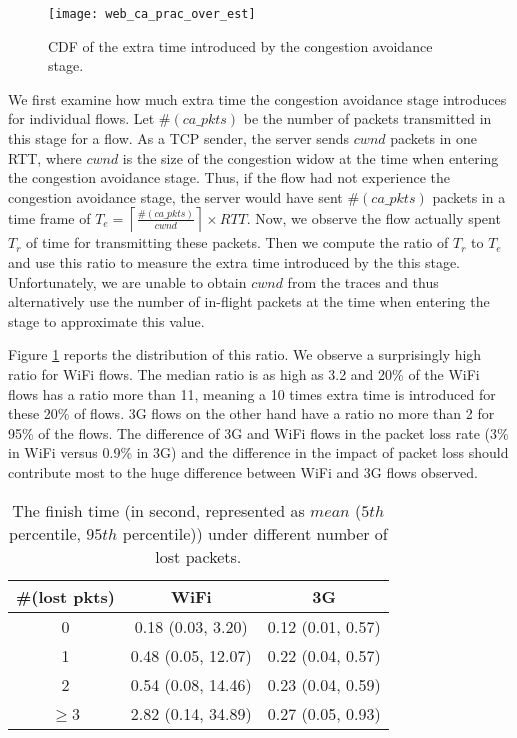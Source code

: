 \begin{figure}[th]
\centering
\texttt{[image: web\_ca\_prac\_over\_est]}
\caption{CDF of the extra time introduced by the congestion avoidance stage.}
\label{fig:web_ca_round}
\end{figure}

We first examine how much extra time the congestion avoidance stage introduces for individual flows. Let $\#(ca\_pkts)$ be the number of packets transmitted in this stage for a flow. As a TCP sender, the server sends $cwnd$ packets in one RTT, where $cwnd$ is the size of the congestion widow at the time when entering the congestion avoidance stage. Thus, if the flow had not experience the congestion avoidance stage, the server would have sent $\#(ca\_pkts)$ packets in a time frame of $T_e =  \left \lceil{\frac{\#(ca\_pkts)}{cwnd}} \right \rceil  \times RTT$. Now, we observe the flow actually spent $T_r$ of time for transmitting these packets. Then we compute the ratio of  $T_r$ to $T_e$ and use this ratio to measure the extra time introduced by the this stage. Unfortunately, we are unable to obtain $cwnd$ from the traces and thus alternatively use the number of in-flight packets at the time when entering the stage to approximate this value\cite{rfc56812009tcp}. 


 
Figure \ref{fig:web_ca_round} reports the distribution of this ratio. We observe a surprisingly high ratio for WiFi flows. The median ratio is as high as 3.2 and 20\% of the WiFi flows has a ratio more than 11, meaning a 10 times extra time is introduced for these 20\% of flows. 3G flows on the other hand have a ratio no more than 2 for 95\% of the flows. The difference of 3G and WiFi flows in the packet loss rate (3\% in WiFi versus 0.9\% in 3G) and the difference in the impact of packet loss should contribute most to the huge difference between WiFi and 3G flows observed. 



\begin{table}[th]
\caption{The finish time (in second, represented as $mean$ ($5th$ percentile, $95th$ percentile)) under different number of lost packets.}
\label{tab:web_loss_finish_time}
\centering
\renewcommand{\arraystretch}{1.0}
\begin{tabular}{c|c|c}
\hline
\#(lost pkts) & WiFi & 3G\\
\hline
0 & 0.18 (0.03, 3.20) & 0.12 (0.01, 0.57) \\
%
1 & 0.48 (0.05, 12.07) & 0.22 (0.04, 0.57) \\
%
2 & 0.54 (0.08, 14.46) & 0.23 (0.04, 0.59) \\
%
$\ge$3 & 2.82 (0.14, 34.89) & 0.27 (0.05, 0.93) \\
\hline
\end{tabular}
\end{table}


